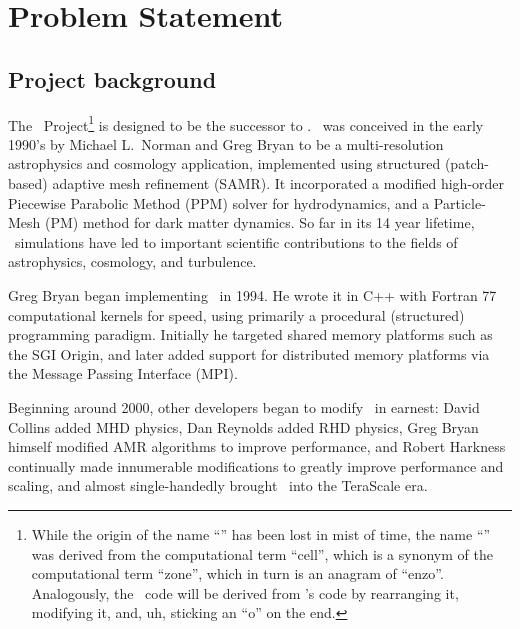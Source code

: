 \documentclass{article}
\begin{document}

\section{Problem Statement}

\subsection{Project background}


    The \cello\ Project\footnote{While the origin of the name
    ``\enzo'' has been lost in mist of time, the name ``\cello'' was
    derived from the computational term ``cell'', which is a synonym
    of the computational term ``zone'', which in turn is an anagram of
    ``enzo''.  Analogously, the \cello\ code will be derived from
    \enzo's code by rearranging it, modifying it, and, uh, sticking an
    ``o'' on the end.}  is designed to be the successor to \enzo.
    \enzo\ was conceived in the early 1990's by Michael L.~Norman and
    Greg Bryan to be a multi-resolution astrophysics and cosmology
    application, implemented using structured (patch-based) adaptive
    mesh refinement (SAMR).  It incorporated a modified high-order
    Piecewise Parabolic Method (PPM) solver for hydrodynamics, and a
    Particle-Mesh (PM) method for dark matter dynamics.  So far in its
    14 year lifetime, \enzo\ simulations have led to important
    scientific contributions to the fields of astrophysics, cosmology,
    and turbulence.

    Greg Bryan began implementing \enzo\ in 1994.  He wrote it in C++
    with Fortran 77 computational kernels for speed, using primarily a
    procedural (structured) programming paradigm.  Initially he
    targeted shared memory platforms such as the SGI Origin, and later
    added support for distributed memory platforms via the Message
    Passing Interface (MPI).

    Beginning around 2000, other developers began to modify \enzo\ in
    earnest: David Collins added MHD physics, Dan Reynolds added
    RHD physics, Greg Bryan himself modified AMR algorithms to improve
    performance, and Robert Harkness continually made innumerable
    modifications to greatly improve performance and scaling, and
    almost single-handedly brought \enzo\ into the TeraScale era.
\end{document}
